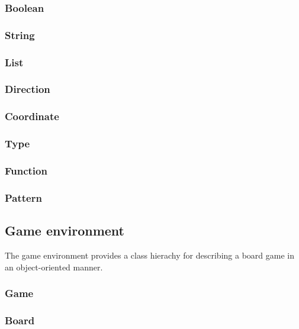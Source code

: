 \subsubsection{Boolean}

\subsubsection{String}

\subsubsection{List}

\subsubsection{Direction}

\subsubsection{Coordinate}

\subsubsection{Type}

\subsubsection{Function}

\subsubsection{Pattern}

\subsection{Game environment}

The game environment provides a class hierachy for describing a board game in an object-oriented manner.

\subsubsection{Game}

\subsubsection{Board}

